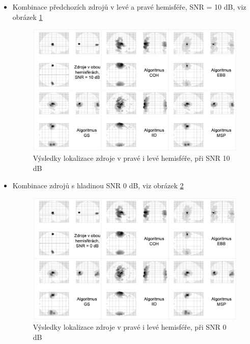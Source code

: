\begin{itemize}
\item Kombinace předchozích zdrojů v levé a pravé hemisféře, SNR = 10 dB, viz obrázek \ref{scenar3}
\begin{figure}[!h]
\includegraphics[width=1.0\textwidth]{casti/aplikace/porovnani/scenar3.png}
\caption{Výsledky lokalizace zdroje v pravé i levé hemisféře, při SNR 10 dB}
\label{scenar3}
\end{figure}

\item Kombinace zdrojů s hladinou SNR 0 dB, viz obrázek \ref{scenar4}
\begin{figure}[!h]
\includegraphics[width=1.0\textwidth]{casti/aplikace/porovnani/scenar4.png}
\caption{Výsledky lokalizace zdroje v pravé i levé hemisféře, při SNR 0 dB}
\label{scenar4}
\end{figure}


\end{itemize}
